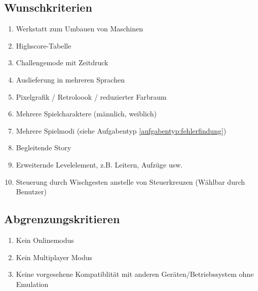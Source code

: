 \documentclass{scrartcl}
\begin{document}
\subsection{Wunschkriterien}

\begin{enumerate}
	\item \label{wunsch:werkstatt}Werkstatt zum Umbauen von Maschinen
	\item \label{wunsch:highscore}Highscore-Tabelle
	\item \label{wunsch:challengemode}Challengemode mit Zeitdruck
	\item \label{wunsch:multilang}Auslieferung in mehreren Sprachen
	\item \label{wunsch:8bit}Pixelgrafik / Retroloook / reduzierter Farbraum
	\item \label{wunsch:multiplechar}Mehrere Spielcharaktere (männlich, weiblich)
	\item \label{wunsch:multiplemode}Mehrere Spielmodi (siehe Aufgabentyp \ref{aufgabentyp:fehlerfindung})
    \item \label{wunsch:story}Begleitende Story %
    \item \label{wunsch:erweiterndeLevelelemente}Erweiternde Levelelement, z.B. Leitern, Aufzüge usw.
    \item \label{wunsch:wischgesten} Steuerung durch Wischgesten anstelle von Steuerkreuzen (Wählbar durch Benutzer)
\end{enumerate}

\subsection{Abgrenzungskritieren}

\begin{enumerate}
	\item \label{abgrenz:online}Kein Onlinemodus
	\item \label{abgrenz:multiplayer}Kein Multiplayer Modus
	\item \label{abgrenz:emu}Keine vorgesehene Kompatiblität mit anderen Geräten/Betriebssystem ohne Emulation
\end{enumerate}

\clearpage










\end{document}
